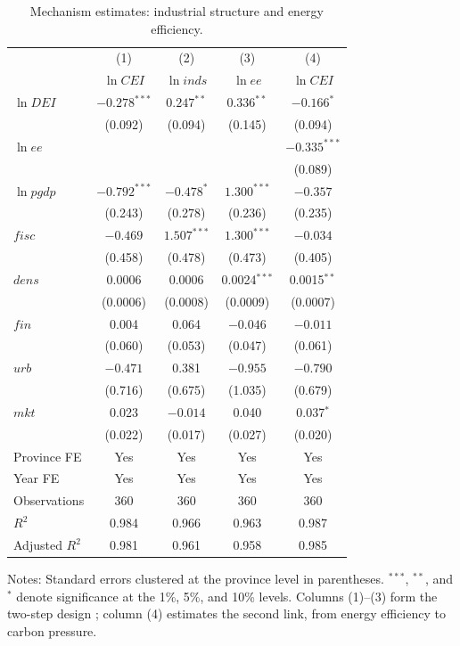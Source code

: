 \documentclass[economies,article,submit,moreauthors]{Definitions/mdpi}
\begin{document}
\begin{table}[!htbp]
\centering
\caption{Mechanism estimates: industrial structure and energy efficiency.}
\label{tab:mechanism}
\footnotesize
\setlength{\tabcolsep}{6pt}
\begin{threeparttable}
\begin{tabular}{lcccc}
\toprule
 & (1) & (2) & (3) & (4)\\
 & $\ln CEI$ & $\ln inds$ & $\ln ee$ & $\ln CEI$\\
\midrule
$\ln DEI$ & $-0.278^{***}$ & $0.247^{**}$ & $0.336^{**}$ & $-0.166^{*}$\\
 & (0.092) & (0.094) & (0.145) & (0.094)\\
$\ln ee$ & & & & $-0.335^{***}$\\
 & & & & (0.089)\\
\midrule
$\ln pgdp$ & $-0.792^{***}$ & $-0.478^{*}$ & $1.300^{***}$ & $-0.357$\\
 & (0.243) & (0.278) & (0.236) & (0.235)\\
$fisc$ & $-0.469$ & $1.507^{***}$ & $1.300^{***}$ & $-0.034$\\
 & (0.458) & (0.478) & (0.473) & (0.405)\\
$dens$ & 0.0006 & 0.0006 & 0.0024$^{***}$ & 0.0015$^{**}$\\
 & (0.0006) & (0.0008) & (0.0009) & (0.0007)\\
$fin$ & 0.004 & 0.064 & $-0.046$ & $-0.011$\\
 & (0.060) & (0.053) & (0.047) & (0.061)\\
$urb$ & $-0.471$ & 0.381 & $-0.955$ & $-0.790$\\
 & (0.716) & (0.675) & (1.035) & (0.679)\\
$mkt$ & 0.023 & $-0.014$ & 0.040 & 0.037$^{*}$\\
 & (0.022) & (0.017) & (0.027) & (0.020)\\
\midrule
Province FE & Yes & Yes & Yes & Yes\\
Year FE & Yes & Yes & Yes & Yes\\
Observations & 360 & 360 & 360 & 360\\
$R^2$ & 0.984 & 0.966 & 0.963 & 0.987\\
Adjusted $R^2$ & 0.981 & 0.961 & 0.958 & 0.985\\
\bottomrule
\end{tabular}
\begin{tablenotes}\footnotesize
\item Notes: Standard errors clustered at the province level in parentheses. $^{***}$, $^{**}$, and $^{*}$ denote significance at the 1\%, 5\%, and 10\% levels. Columns (1)--(3) form the two-step design \citep{imai2010,bullock2010}; column (4) estimates the second link, from energy efficiency to carbon pressure.
\end{tablenotes}
\end{threeparttable}
\end{table}
\end{document}

